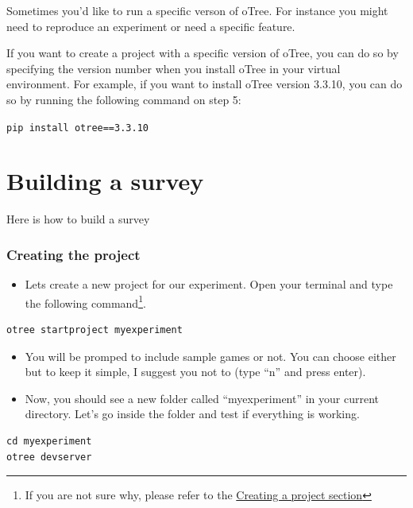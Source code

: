 \documentclass[
  letterpaper,
  DIV=11,
  numbers=noendperiod]{scrreprt}
\providecommand{\tightlist}{%
  \setlength{\itemsep}{0pt}\setlength{\parskip}{0pt}}\usepackage{longtable,booktabs,array}
\begin{document}
Sometimes you'd like to run a specific verson of oTree. For instance you
might need to reproduce an experiment or need a specific feature.

If you want to create a project with a specific version of oTree, you
can do so by specifying the version number when you install oTree in
your virtual environment. For example, if you want to install oTree
version 3.3.10, you can do so by running the following command on step
5:

\texttt{pip\ install\ otree==3.3.10}

\hypertarget{building-a-survey}{%
\chapter{Building a survey}\label{building-a-survey}}

Here is how to build a survey

\hypertarget{creating-the-project}{%
\subsection{Creating the project}\label{creating-the-project}}

\begin{itemize}
\tightlist
\item
  Lets create a new project for our experiment. Open your terminal and
  type the following command\footnote{If you are not sure why, please
    refer to the \protect\hyperlink{creating-an-otree-project}{Creating
    a project section}}.
\end{itemize}

\begin{verbatim}
otree startproject myexperiment
\end{verbatim}

\begin{itemize}
\item
  You will be promped to include sample games or not. You can choose
  either but to keep it simple, I suggest you not to (type ``n'' and
  press enter).
\item
  Now, you should see a new folder called ``myexperiment'' in your
  current directory. Let's go inside the folder and test if everything
  is working.
\end{itemize}

\begin{verbatim}
cd myexperiment
otree devserver
\end{verbatim}
\end{document}
